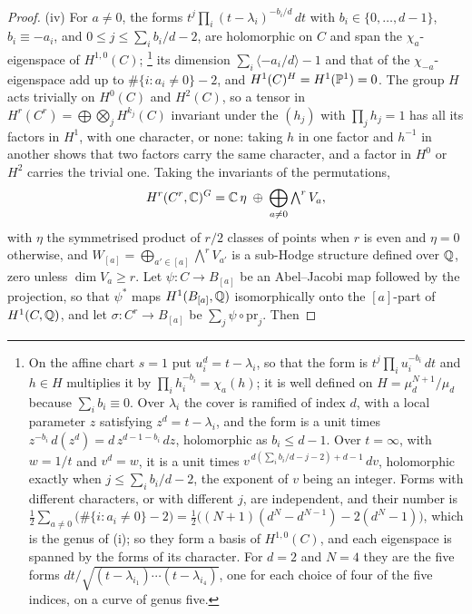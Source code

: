 \begin{proof}
(iv) For $a\ne0$, the forms
$t^{j}\prod_{i}(t-\lambda_{i})^{-b_{i}/d}\,dt$ with $b_{i}\in\{0,\dots,d-1\}$,
$b_{i}\equiv-a_{i}$, and $0\le j\le\sum_{i}b_{i}/d-2$, are holomorphic on $C$
and span the $\chi_{a}$-eigenspace of $H^{1,0}(C)$;%
\footnote{On the affine chart $s=1$ put $u_{i}^{d}=t-\lambda_{i}$, so that the
form is $t^{j}\prod_{i}u_{i}^{-b_{i}}\,dt$ and $h\in H$ multiplies it by
$\prod_{i}h_{i}^{-b_{i}}=\chi_{a}(h)$; it is well defined on
$H=\mu_{d}^{N+1}/\mu_{d}$ because $\sum_{i}b_{i}\equiv0$. Over $\lambda_{i}$
the cover is ramified of index $d$, with a local parameter $z$ satisfying
$z^{d}=t-\lambda_{i}$, and the form is a unit times
$z^{-b_{i}}\,d(z^{d})=d\,z^{d-1-b_{i}}\,dz$, holomorphic as $b_{i}\le d-1$.
Over $t=\infty$, with $w=1/t$ and $v^{d}=w$, it is a unit times
$v^{\,d(\sum_{i}b_{i}/d-j-2)+d-1}\,dv$, holomorphic exactly when
$j\le\sum_{i}b_{i}/d-2$, the exponent of $v$ being an integer. Forms with
different characters, or with different $j$, are independent, and their
number is
$\tfrac12\sum_{a\ne0}\bigl(\#\{i:a_{i}\ne0\}-2\bigr)
=\tfrac12\bigl((N+1)(d^{N}-d^{N-1})-2(d^{N}-1)\bigr)$, which is the genus of
(i); so they form a basis of $H^{1,0}(C)$, and each eigenspace is spanned by
the forms of its character. For $d=2$ and $N=4$ they are the five forms
$dt/\sqrt{(t-\lambda_{i_{1}})\cdots(t-\lambda_{i_{4}})}$, one for each choice
of four of the five indices, on a curve of genus five.}
its dimension
$\sum_{i}\langle-a_{i}/d\rangle-1$ and that of the $\chi_{-a}$-eigenspace add up
to $\#\{i:a_{i}\ne0\}-2$, and $H^{1}(C)^{H}=H^{1}(\mathbb{P}^{1})=0$. The group $H$
acts trivially on $H^{0}(C)$ and $H^{2}(C)$, so a tensor in
$H^{r}(C^{r})=\bigoplus\bigotimes_{j}H^{k_{j}}(C)$ invariant under the
$(h_{j})$ with $\prod_{j}h_{j}=1$ has all its factors in $H^{1}$, with one
character, or none: taking $h$ in one factor and $h^{-1}$ in another shows
that two factors carry the same character, and a factor in $H^{0}$ or
$H^{2}$ carries the trivial one. Taking the invariants of the permutations,
\[
  H^{r}(C^{r},\mathbb{C})^{G}=\mathbb{C}\,\eta\;\oplus\;\bigoplus_{a\ne0}\textstyle\bigwedge^{r}V_{a},
\]
with $\eta$ the symmetrised product of $r/2$ classes of points when $r$ is
even and $\eta=0$ otherwise, and $W_{[a]}=\bigoplus_{a'\in[a]}\bigwedge^{r}V_{a'}$
is a sub-Hodge structure defined over $\mathbb{Q}$, zero unless $\dim V_{a}\ge r$.
Let $\psi\colon C\to B_{[a]}$ be an Abel--Jacobi map followed by the
projection, so that $\psi^{*}$ maps $H^{1}(B_{[a]},\mathbb{Q})$ isomorphically onto
the $[a]$-part of $H^{1}(C,\mathbb{Q})$, and let $\sigma\colon C^{r}\to B_{[a]}$ be
$\sum_{j}\psi\circ\mathrm{pr}_{j}$. Then

\end{proof}
